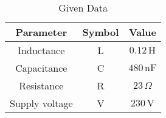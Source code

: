 \begin{table}[htbp]
\setcounter{table}{1} %
\centering
\caption{Given Data}
\label{tab:sample_table}
\begin{tabular}{|c|c|c|}
\hline
\textbf{Parameter} & \textbf{Symbol} & \textbf{Value} \\
\hline
Inductance & L & $0.12 \, \text{H}$ \\
\hline
Capacitance & C & $480 \, \text{nF}$ \\
\hline
Resistance & R & $23 \, \Omega$ \\
\hline
Supply voltage & V & $230 \, \text{V}$ \\
\hline
\end{tabular}
\end{table}
